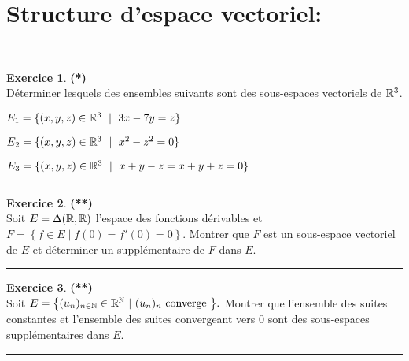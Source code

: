 \documentclass[a4paper,11pt]{article}
\theoremstyle{definition}
\newtheorem{exo}{Exercice} %
\begin{document}
\raggedright

\section*{Structure d’espace vectoriel:}\hfill\\%

   
\begin{minipage}{1\linewidth}\begin{minipage}[t]{0.48\linewidth}\raggedright
	
\begin{exo}\textbf{(*)}\quad\\[0.2cm]
D\' eterminer lesquels des
ensembles suivants sont des sous-espaces
vectoriels de ${\mathbb{R}}^3$. 

$E_1 =\{ (x,y,z)\in {\mathbb{R}}^3\ \mid \ 3x-7y = z \} $ 

$E_2 =\{(x,y,z)\in {\mathbb{R}}^3\ \mid \ x^2-z^2=0 \} $  

$E_3=\{ (x,y,z)\in {\R}^3\ \mid \ x+y-z=x+y+z=0  \} $ 

	
\centering\rule{1\linewidth}{0.6pt}\end{exo}



\begin{exo}\textbf{(**)}\quad\\[0.2cm]
	Soit $E = \Delta (\mathbb{R}, \mathbb{R})$ l'espace des fonctions dérivables
	et $F = \left\{ f \in E \mid f (0) = f' (0) = 0\right\}$. Montrer que $F$
	est un sous-espace vectoriel de $E$ et d\'eterminer un
	suppl\'ementaire de $F$ dans $E$.
	
	\centering\rule{1\linewidth}{0.6pt}\end{exo}

\begin{exo}\textbf{(**)}\quad\\[0.2cm]
	Soit $E=\big\{(u_{n})_{n\in
		\mathbb{N}}\in \mathbb{R}^{\mathbb{N}}\ |\ (u_{n})_{n} \text{ converge }\big\}.$
	Montrer que
	l'ensemble des suites constantes et l'ensemble des suites convergeant
	vers $0$ sont des sous-espaces suppl\'{e}mentaires dans $E.$
	
	\centering\rule{1\linewidth}{0.6pt}\end{exo}


\end{minipage}\hfill\vrule\hfill\begin{minipage}[t]{0.48\linewidth}\raggedright



\end{minipage}
\end{minipage}
\end{document}
